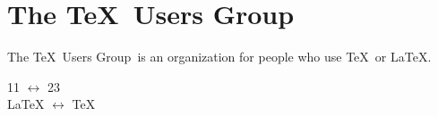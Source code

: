 \documentclass{article}
\newcommand{\link}[2]{#1 $\leftrightarrow$ #2}
\newcommand{\TUG}{\TeX\ Users Group}
\begin{document}
\section{The \TUG}
The \TUG\ is an organization for people who use
\TeX\ or \LaTeX.

\link{11}{23}\\
\link{\LaTeX}{\TeX}
\end{document}
